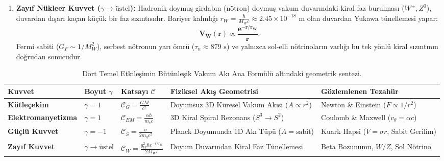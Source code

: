 \begin{enumerate}
    \item \textbf{Zayıf Nükleer Kuvvet ($\gamma \to \text{üstel}$):} Hadronik doymuş girdabın (nötron) doymuş vakum duvarındaki kiral faz burulması ($W^\pm, Z^0$), duvardan dışarı kaçan küçük bir faz sızıntısıdır. Bariyer kalınlığı $r_W = \frac{\hbar}{M_W c} \approx 2.45 \times 10^{-18}\text{ m}$ olan duvardan Yukawa tünellemesi yapar:
          \begin{equation}
              \mathbf{V_W(r) \propto \frac{e^{-r/r_W}}{r}}.
          \end{equation}
          Fermi sabiti ($G_F \sim 1/M_W^2$), serbest nötronun yarı ömrü ($\tau_n \approx 879\text{ s}$) ve yalnızca sol-elli nötrinoların varlığı bu tek yönlü kiral sızıntının doğrudan sonucudur.
\end{enumerate}

\begin{table}[h!]
    \centering
    \small
    \begin{tabular}{@{}lllll@{}}
        \toprule
        \textbf{Kuvvet}            & \textbf{Boyut $\gamma$}   & \textbf{Katsayı $\mathcal{C}$}                           & \textbf{Fiziksel Akış Geometrisi}                 & \textbf{Gözlemlenen Tezahür}                \\ \midrule
        \textbf{Kütleçekim}        & $\gamma = 1$              & $\mathcal{C}_G = \frac{GM}{c^2}$                         & Doyumsuz 3D Küresel Vakum Akısı ($A \propto r^2$) & Newton \& Einstein ($F \propto 1/r^2$)      \\
        \textbf{Elektromanyetizma} & $\gamma = 1$              & $\mathcal{C}_{EM} = \frac{\alpha \hbar}{m_e c}$          & 3D Kiral Spiral Rezonans ($S^3 \to S^2$)          & Coulomb \& Maxwell ($v_\theta = \alpha c$)  \\
        \textbf{Güçlü Kuvvet}      & $\gamma = -1$             & $\mathcal{C}_S = \frac{\sigma}{2 m_q c^2}$               & Planck Doyumunda 1D Akı Tüpü ($A = \text{sabit}$) & Kuark Hapsi ($V = \sigma r$, Sabit Gerilim) \\
        \textbf{Zayıf Kuvvet}      & $\gamma \to \text{üstel}$ & $\mathcal{C}_W = \frac{g_W^2 \hbar e^{-r/r_W}}{2 M_W c}$ & Doyum Duvarından Kiral Faz Tünellemesi            & Beta Bozunumu, $W/Z$, Sol Nötrino           \\ \bottomrule
    \end{tabular}
    \caption{Dört Temel Etkileşimin Bütünleşik Vakum Akı Ana Formülü altındaki geometrik sentezi.}
    \label{tab:dort_kuvvet_sentez_main}
\end{table}

